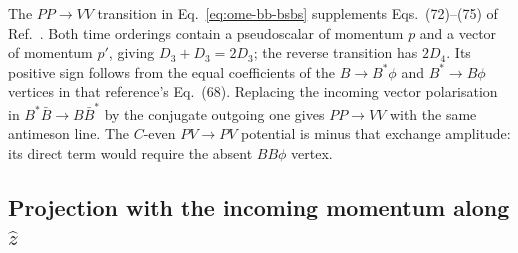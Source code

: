 The $PP\to VV$ transition in Eq.~\eqref{eq:ome-bb-bsbs} supplements
Eqs.~(72)--(75) of Ref.~\cite{Zhang:2026iyr}.
Both time orderings contain a pseudoscalar of momentum $p$ and a vector
of momentum $p'$, giving $D_3+D_3=2D_3$; the reverse transition has $2D_4$.
Its positive sign follows from the equal coefficients of the
$B\to B^*\phi$ and $B^*\to B\phi$ vertices in that reference's Eq.~(68).
Replacing the incoming vector polarisation in
$B^*\bar B\to B\bar B^*$ by the conjugate outgoing one gives $PP\to VV$
with the same antimeson line. The $C$-even $PV\to PV$ potential is minus
that exchange amplitude: its direct term would require the absent
$BB\phi$ vertex.

\subsection{Projection with the incoming momentum along $\hat z$}

